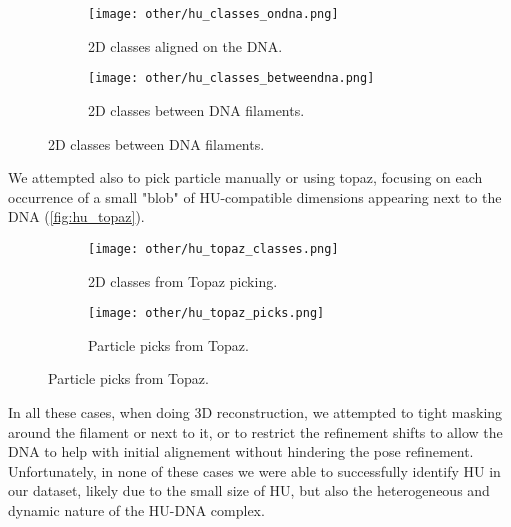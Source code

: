 \begin{figure}[ht]
    \centering
    \begin{subfigure}[B]{.49\textwidth}
        \centering
        \texttt{[image: other/hu\_classes\_ondna.png]}
        \caption{2D classes aligned on the DNA.}
        \label{fig:hu_classes_ondna}
    \end{subfigure}%
    \hfill
    \begin{subfigure}[B]{.49\textwidth}
        \centering
        \texttt{[image: other/hu\_classes\_betweendna.png]}
        \caption{2D classes between DNA filaments.}
        \label{fig:hu_classes_betweendna}
    \end{subfigure}%
    \label{fig:hu_classes}
\end{figure}

We attempted also to pick particle manually or using topaz, focusing on each occurrence of a small "blob" of HU-compatible dimensions appearing next to the DNA (\autoref{fig:hu_topaz}).

\begin{figure}[]
    \centering
    \begin{subfigure}[B]{.5\textwidth}
        \centering
        \texttt{[image: other/hu\_topaz\_classes.png]}
        \caption{2D classes from Topaz picking.}
        \label{fig:hu_topaz_classes}
    \end{subfigure}%
    \hfill
    \begin{subfigure}[B]{.5\textwidth}
        \centering
        \texttt{[image: other/hu\_topaz\_picks.png]}
        \caption{Particle picks from Topaz.}
        \label{fig:hu_topaz_picks}
    \end{subfigure}%
    \label{fig:hu_topaz}
\end{figure}

In all these cases, when doing 3D reconstruction, we attempted to tight masking around the filament or next to it, or to restrict the refinement shifts to allow the DNA to help with initial alignement without hindering the pose refinement.
Unfortunately, in none of these cases we were able to successfully identify HU in our dataset, likely due to the small size of HU, but also the heterogeneous and dynamic nature of the HU-DNA complex.


